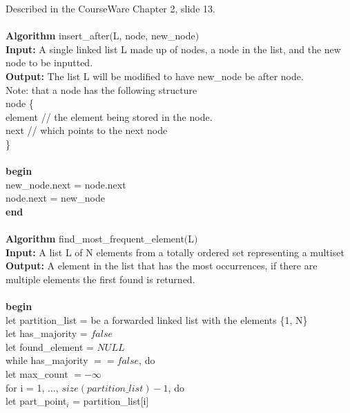 \documentclass{article}
\begin{document}
      \indent Described in the CourseWare Chapter 2, slide 13. \\
      \\
      \textbf{Algorithm} insert\_after$($L, node, new\_node$)$ \\
      \textbf{Input:} A single linked list L made up of nodes, a node in the list, and the new node to be inputted. \\
      \textbf{Output:} The list L will be modified to have new\_node be after node. \\
      \indent Note: that a node has the following structure \\
      \indent node \{\\
      \indent\indent element // the element being stored in the node. \\
      \indent\indent next // which points to the next node \\
      \indent \} \\
      \\
      \textbf{begin} \\
      \indent new\_node.next = node.next \\
      \indent node.next = new\_node \\
      \textbf{end} \\
      \\
      \textbf{Algorithm} find\_most\_frequent\_element$($L$)$ \\
      \textbf{Input:} A list L of N elements from a totally ordered set representing a multiset \\
      \textbf{Output:} A element in the list that has the most occurrences, if there are multiple elements the first found is returned.\\ 
      \\
      \textbf{begin} \\
      \indent let partition\_list = be a forwarded linked list with the elements \{1, N\} \\
      \indent let has\_majority = $false$ \\
      \indent let found\_element = $NULL$ \\
      \indent while has\_majority $== false$, do \\
      \indent\indent let max\_count $= -\infty$ \\
      \indent\indent for i = 1, $\ldots$, $size(partition\_list) - 1$, do \\
      \indent\indent\indent let part\_point$_{i}$ = partition\_list[i] \\
\end{document}
